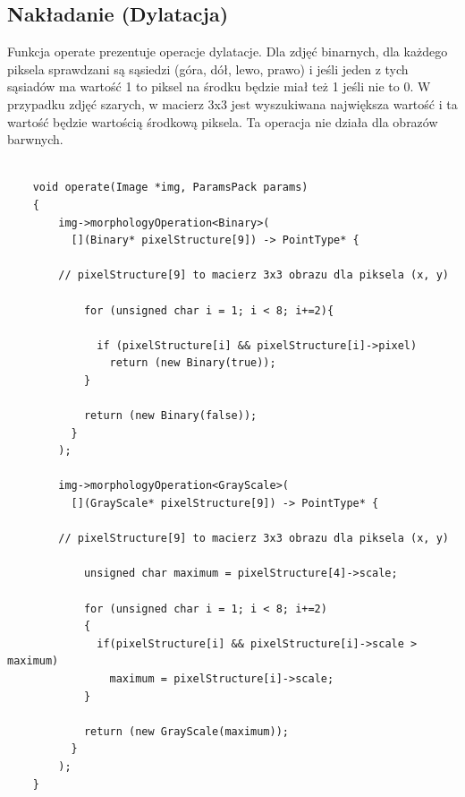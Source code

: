 \documentclass{article}
\begin{document}
\subsection{Nakładanie (Dylatacja)}
Funkcja operate prezentuje operacje dylatacje. Dla zdjęć binarnych, dla każdego piksela sprawdzani są sąsiedzi (góra, dół, lewo, prawo) i jeśli jeden z tych sąsiadów ma wartość 1 to piksel na środku będzie miał też 1 jeśli nie to 0. W przypadku zdjęć szarych, w macierz 3x3 jest wyszukiwana największa wartość i ta wartość będzie wartością środkową piksela. Ta operacja nie działa dla obrazów barwnych.\\
\begin{Verbatim}[frame=single,label=Dylatacja (Source Code)]

    void operate(Image *img, ParamsPack params)
    {
        img->morphologyOperation<Binary>(
          [](Binary* pixelStructure[9]) -> PointType* {
                      
		// pixelStructure[9] to macierz 3x3 obrazu dla piksela (x, y)           
          
            for (unsigned char i = 1; i < 8; i+=2){
            
              if (pixelStructure[i] && pixelStructure[i]->pixel)
                return (new Binary(true));
            }
            
            return (new Binary(false));
          }
        );

        img->morphologyOperation<GrayScale>(
          [](GrayScale* pixelStructure[9]) -> PointType* {
                    
		// pixelStructure[9] to macierz 3x3 obrazu dla piksela (x, y)           
          
            unsigned char maximum = pixelStructure[4]->scale;
            
            for (unsigned char i = 1; i < 8; i+=2)
            {
              if(pixelStructure[i] && pixelStructure[i]->scale > maximum)
                maximum = pixelStructure[i]->scale;
            }
            
            return (new GrayScale(maximum));
          }
        );
    }
    
\end{Verbatim}
\end{document}
